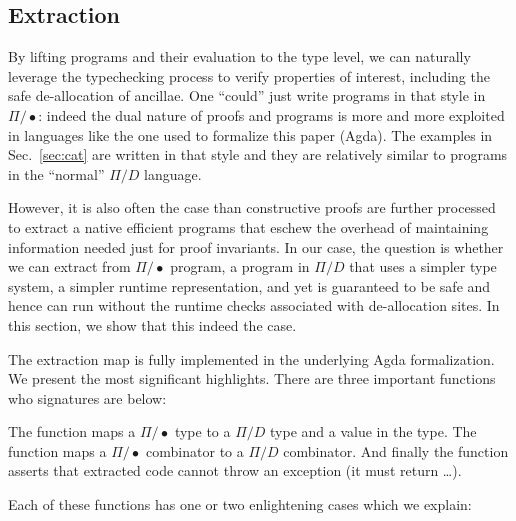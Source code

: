 \documentclass[sigplan,10pt,review,anonymous]{acmart}
\newcommand{\Afun}[1]{\AgdaFunction{#1}}
\newcommand{\Acon}[1]{\AgdaInductiveConstructor{#1}}
\begin{document}
{\center}

\subsection{Extraction}

By lifting programs and their evaluation to the type level, we can
naturally leverage the typechecking process to verify properties of
interest, including the safe de-allocation of ancillae. One ``could''
just write programs in that style in $\Pi/\bullet$: indeed the dual nature of proofs
and programs is more and more exploited in languages like the one used
to formalize this paper (Agda). The examples in Sec.~\ref{sec:cat} are
written in that style and they are relatively similar to programs
in the ``normal'' $\Pi/D$ language.

However, it is also often the case than constructive proofs are
further processed to extract a native efficient programs that eschew
the overhead of maintaining information needed just for proof
invariants. In our case, the question is whether we can extract from
$\Pi/\bullet$ program, a program in $\Pi/D$ that uses a simpler type
system, a simpler runtime representation, and yet is guaranteed to be
safe and hence can run without the runtime checks associated with
de-allocation sites. In this section, we show that this indeed the
case.


The extraction map is fully implemented in the underlying Agda
formalization. We present the most significant highlights. There are
three important functions who signatures are below:

\EXTsig{}

The function \Afun{Ext𝕌} maps a $\Pi/\bullet$ type to a $\Pi/D$ type
and a value in the type. The function \Afun{Ext∙⟶} maps a
$\Pi/\bullet$ combinator to a $\Pi/D$ combinator. And finally the
function \Afun{Ext≡} asserts that extracted code cannot throw an
exception (it must return \Acon{just}\ldots).

Each of these functions has one or two enlightening cases which we
explain:
\end{document}
